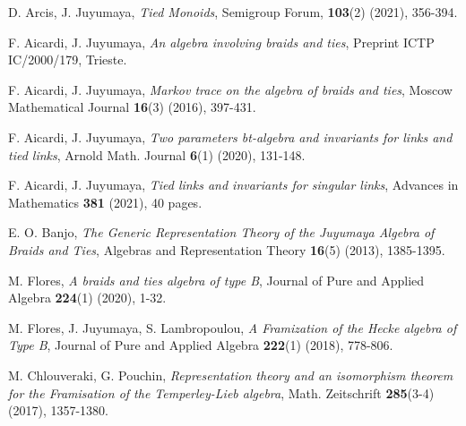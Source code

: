 \documentclass[10pt,a4,twoside,hidelinks,rm]{article}
\theoremstyle{plain}
\begin{document}
\begin{thebibliography}{99}


  
 D. Arcis, J. Juyumaya, \textit{Tied Monoids}, {\color{black}
Semigroup Forum, {\bf 103}(2) (2021), 356-394.
}
   



 F. Aicardi, J. Juyumaya, \textit{An algebra involving braids and ties},  Preprint ICTP IC/2000/179, Trieste.

 F. Aicardi, J. Juyumaya, \textit{Markov trace on the algebra of braids and ties}, Moscow Mathematical Journal
{\bf 16}(3) (2016), 397-431.


 F. Aicardi, J. Juyumaya, \textit{Two parameters bt-algebra and invariants for links and tied links}, {\color{black}
Arnold Math. Journal {\bf 6}(1) (2020), 131-148. }
  


 F. Aicardi, J. Juyumaya, \textit{Tied links and invariants for singular links}, Advances in Mathematics {\bf 381} (2021), 40 pages.
  
  





 E. O. Banjo, \textit{The Generic Representation Theory of the Juyumaya Algebra of Braids and Ties},
Algebras and Representation Theory {\bf 16}(5) (2013), 1385-1395.

 M. Flores, 
\textit{A braids and ties algebra of type B}, Journal of Pure and Applied Algebra {\bf 224}(1) (2020), 1-32.




 M. Flores, J. Juyumaya, S. Lambropoulou, \textit{A Framization of the Hecke algebra of Type B}, Journal of Pure and Applied Algebra {\bf 222}(1) (2018), 778-806.


 M. Chlouveraki, G. Pouchin, \textit{Representation theory and an isomorphism theorem for the Framisation of the Temperley-Lieb algebra},
Math. Zeitschrift {\bf 285}(3-4) (2017), 1357-1380.





\end{thebibliography}
\end{document}
